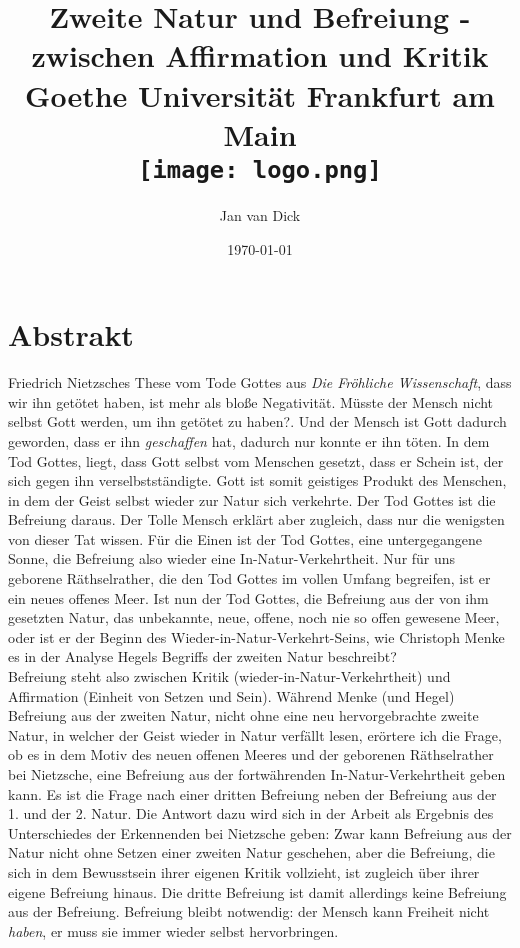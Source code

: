 \documentclass[12pt, a4paper, openany]{report}
\title{
    {Zweite Natur und Befreiung - zwischen Affirmation und Kritik}\\
    {\large Goethe Universität Frankfurt am Main}\\
    {\texttt{[image: logo.png]}}
}
\author{Jan van Dick}
\date{\today}
\newcommand\frontmatter{ \cleardoublepage \pagenumbering{roman}}
\begin{document}
\maketitle
\frontmatter


\chapter*{Abstrakt}
Friedrich Nietzsches These vom Tode Gottes aus \textit{Die Fröhliche Wissenschaft}, dass \glqq wir\grqq{} ihn getötet haben, ist mehr als bloße Negativität. 
Müsste der Mensch nicht selbst Gott werden, um ihn getötet zu haben?. 
Und der Mensch ist Gott dadurch geworden, dass er ihn \textit{geschaffen} hat, dadurch nur konnte er ihn töten. 
In dem Tod Gottes, liegt, dass Gott selbst vom Menschen gesetzt, dass er Schein ist, der sich gegen ihn verselbstständigte.
Gott ist somit geistiges Produkt des Menschen, in dem der Geist selbst wieder zur Natur sich verkehrte.
Der Tod Gottes ist die Befreiung daraus.
Der \glqq Tolle Mensch\grqq{} erklärt aber zugleich, dass nur die wenigsten von dieser Tat wissen. 
Für die Einen ist der Tod Gottes, eine untergegangene Sonne, die Befreiung also wieder eine In-Natur-Verkehrtheit.
Nur für uns \glqq geborene Räthselrather\grqq, die den Tod Gottes im vollen Umfang begreifen, ist er ein \glqq neues offenes Meer\grqq{}.
Ist nun der Tod Gottes, die Befreiung aus der von ihm gesetzten Natur, das unbekannte, neue, offene, noch nie so offen gewesene Meer, oder ist er der Beginn des Wieder-in-Natur-Verkehrt-Seins, wie Christoph Menke es in der Analyse Hegels Begriffs der zweiten Natur beschreibt?\\
Befreiung steht also zwischen Kritik (wieder-in-Natur-Verkehrtheit) und Affirmation (Einheit von Setzen und Sein).
Während Menke (und Hegel) Befreiung aus der zweiten Natur, nicht ohne eine neu hervorgebrachte zweite Natur, in welcher der Geist wieder in Natur verfällt lesen, erörtere ich die Frage, ob es in dem Motiv des \glqq neuen offenen Meeres\grqq{} und der \glqq geborenen Räthselrather\grqq{} bei Nietzsche, eine Befreiung aus der fortwährenden In-Natur-Verkehrtheit geben kann.
Es ist die Frage nach einer dritten Befreiung neben der Befreiung aus der 1. und der 2. Natur. 
Die Antwort dazu wird sich in der Arbeit als Ergebnis des Unterschiedes der \glqq Erkennenden\grqq{} bei Nietzsche geben:
Zwar kann Befreiung aus der Natur nicht ohne Setzen einer zweiten Natur geschehen, aber die Befreiung, die sich in dem Bewusstsein ihrer eigenen Kritik vollzieht, ist zugleich über ihrer eigene Befreiung hinaus.
Die dritte Befreiung ist damit allerdings keine Befreiung aus der Befreiung.
Befreiung bleibt notwendig: der Mensch kann Freiheit nicht \textit{haben}, er muss sie immer wieder selbst hervorbringen.
\end{document}
